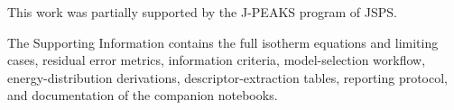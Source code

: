 \documentclass[journal=jacsat,manuscript=article]{achemso}
\begin{document}

	\begin{acknowledgement}
		This work was partially supported by the J-PEAKS program of JSPS. 
	\end{acknowledgement}

	\begin{suppinfo}
The Supporting Information contains the full isotherm equations and limiting cases, residual error metrics, information criteria, model-selection workflow, energy-distribution derivations, descriptor-extraction tables, reporting protocol, and documentation of the companion notebooks.
\end{suppinfo}

	
	
\end{document}
